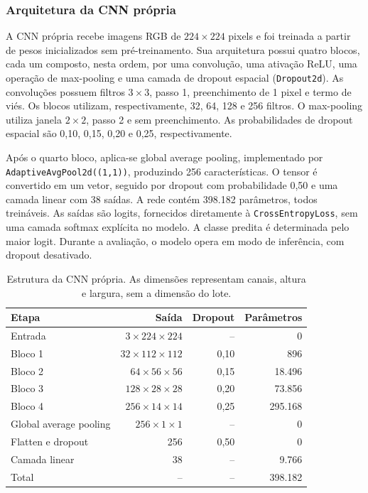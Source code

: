 
\subsubsection{Arquitetura da CNN própria}
A CNN própria recebe imagens RGB de $224\times224$ pixels e foi treinada
a partir de pesos inicializados sem pré-treinamento. Sua arquitetura possui
quatro blocos, cada um composto, nesta ordem, por uma convolução, uma
ativação ReLU, uma operação de max-pooling e uma camada de dropout espacial
(\texttt{Dropout2d}). As convoluções possuem filtros $3\times3$, passo 1,
preenchimento de 1 pixel e termo de viés. Os blocos utilizam, respectivamente,
32, 64, 128 e 256 filtros. O max-pooling utiliza janela $2\times2$, passo 2 e
sem preenchimento. As probabilidades de dropout espacial são 0,10, 0,15,
0,20 e 0,25, respectivamente.

Após o quarto bloco, aplica-se global average pooling, implementado por
\texttt{AdaptiveAvgPool2d((1,1))}, produzindo 256 características. O tensor
é convertido em um vetor, seguido por dropout com probabilidade 0,50 e uma
camada linear com 38 saídas. A rede contém 398.182 parâmetros, todos
treináveis. As saídas são logits, fornecidos diretamente à
\texttt{CrossEntropyLoss}, sem uma camada softmax explícita no modelo.
A classe predita é determinada pelo maior logit. Durante a avaliação, o
modelo opera em modo de inferência, com dropout desativado.

\begin{table}[t]
\centering
\caption{Estrutura da CNN própria. As dimensões representam canais, altura
e largura, sem a dimensão do lote.}
\label{tab:cnn-propria-detalhada}
\small
\begin{tabular}{lrrr}
\toprule
Etapa & Saída & Dropout & Parâmetros \\
\midrule
Entrada & $3\times224\times224$ & -- & 0 \\
Bloco 1 & $32\times112\times112$ & 0,10 & 896 \\
Bloco 2 & $64\times56\times56$ & 0,15 & 18.496 \\
Bloco 3 & $128\times28\times28$ & 0,20 & 73.856 \\
Bloco 4 & $256\times14\times14$ & 0,25 & 295.168 \\
Global average pooling & $256\times1\times1$ & -- & 0 \\
Flatten e dropout & 256 & 0,50 & 0 \\
Camada linear & 38 & -- & 9.766 \\
\midrule
Total & -- & -- & 398.182 \\
\bottomrule
\end{tabular}
\end{table}

